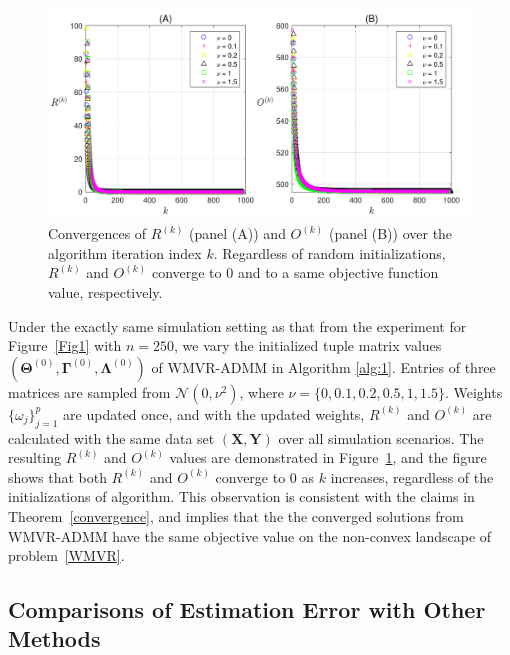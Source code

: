 \documentclass[alpha-refs]{wiley-article}
\begin{document}
\begin{figure} [t!]
  \includegraphics[width=120mm]{Figure/Fig4.pdf}
  \centering
  \caption{Convergences of $R^{(k)}$ (panel (A)) and $O^{(k)}$ (panel (B)) over the algorithm iteration index $k$.
  Regardless of random initializations, $R^{(k)}$ and $O^{(k)}$ converge to $0$ and to a same objective function value, respectively.}
  \label{Fig4}
\end{figure}

Under the exactly same simulation setting as that from the experiment for Figure~\ref{Fig1} with $n=250$, we vary the initialized tuple matrix values $(\boldsymbol{\Theta}^{(0)},\boldsymbol{\Gamma}^{(0)},\boldsymbol{\Lambda}^{(0)})$ of WMVR-ADMM in Algorithm \ref{alg:1}.
Entries of three matrices are sampled from $\mathcal{N}(0,\nu^{2})$, where $\nu=\{0,0.1,0.2,0.5,1,1.5\}$.
Weights $\{\omega_j\}_{j=1}^{p}$ are updated once, and with the updated weights, $R^{(k)}$ and $O^{(k)}$ are calculated with the same data set $(\boldsymbol{X},\boldsymbol{Y})$ over all simulation scenarios.
The resulting  $R^{(k)}$ and $O^{(k)}$ values are demonstrated in Figure~\ref{Fig4}, and the figure shows that both $R^{(k)}$ and $O^{(k)}$ converge to 0 as $k$ increases, regardless of the initializations of algorithm.
This observation is consistent with the claims in Theorem~\ref{convergence}, and implies that the the converged solutions from WMVR-ADMM have the same objective value on the non-convex landscape of problem~\eqref{WMVR}.

\subsection{Comparisons of Estimation Error with Other Methods}
\end{document}
